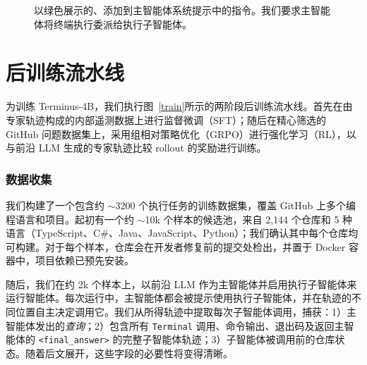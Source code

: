 \documentclass[sigconf,review]{acmart}
\begin{document}
\begin{figure}[t]
\centering
{}
\caption{以绿色展示的、添加到主智能体系统提示中的指令。我们要求主智能体将终端执行委派给执行子智能体。}
\label{main_prompt_diff}
\end{figure}

\section{后训练流水线}
为训练 Terminus-4B，我们执行图~\ref{train}所示的两阶段后训练流水线。首先在由专家轨迹构成的内部遥测数据上进行监督微调（SFT）；随后在精心筛选的 GitHub 问题数据集上，采用组相对策略优化（GRPO）进行强化学习（RL），以与前沿 LLM 生成的专家轨迹比较 rollout 的奖励进行训练。

\subsubsection{数据收集}
\label{data}
我们构建了一个包含约 $\sim$3200 个执行任务的训练数据集，覆盖 GitHub 上多个编程语言和项目。起初有一个约 $\sim$10k 个样本的候选池，来自 2{,}144 个仓库和 5 种语言（TypeScript、C\#、Java、JavaScript、Python）；我们确认其中每个仓库均可构建。对于每个样本，仓库会在开发者修复前的提交处检出，并置于 Docker 容器中，项目依赖已预先安装。

随后，我们在约 2k 个样本上，以前沿 LLM 作为主智能体并启用执行子智能体来运行智能体。每次运行中，主智能体都会被提示使用执行子智能体，并在轨迹的不同位置自主决定调用它。我们从所得轨迹中提取每次子智能体调用，捕获：1）主智能体发出的\textit{查询}；2）包含所有 \texttt{Terminal} 调用、命令输出、退出码及返回主智能体的 \texttt{<final\_answer>} 的完整子智能体轨迹；3）子智能体被调用前的仓库状态。随着后文展开，这些字段的必要性将变得清晰。
\end{document}
